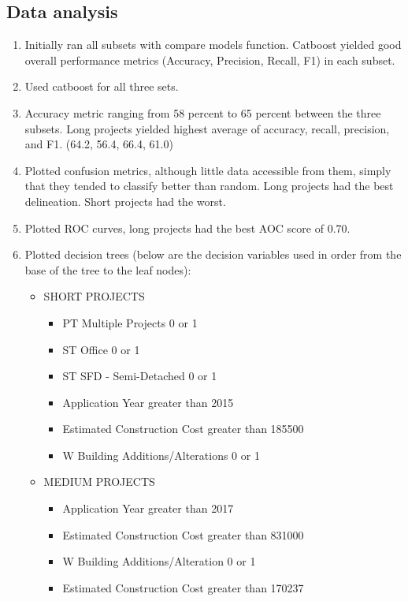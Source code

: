 \documentclass{article}
\begin{document}
\subsection{Data analysis}
\begin{enumerate}
    \item Initially ran all subsets with compare models function. Catboost yielded good overall performance metrics (Accuracy, Precision, Recall, F1) in each subset.
    \item Used catboost for all three sets.
    \item Accuracy metric ranging from 58 percent to 65 percent between the three subsets. Long projects yielded highest average of accuracy, recall, precision, and F1. (64.2, 56.4, 66.4, 61.0)
    \item Plotted confusion metrics, although little data accessible from them, simply that they tended to classify better than random. Long projects had the best delineation. Short projects had the worst.
    \item Plotted ROC curves, long projects had the best AOC score of 0.70. 
    \item Plotted decision trees (below are the decision variables used in order from the base of the tree to the leaf nodes): 
    \begin{itemize}
        \item SHORT PROJECTS
        \begin{itemize}
            \item PT Multiple Projects 0 or 1
            \item ST Office 0 or 1
            \item ST SFD - Semi-Detached 0 or 1
            \item Application Year greater than 2015
            \item Estimated Construction Cost greater than 185500
            \item W Building Additions/Alterations 0 or 1
        \end{itemize}
        \item MEDIUM PROJECTS
        \begin{itemize}
            \item Application Year greater than 2017
            \item Estimated Construction Cost greater than 831000
            \item W Building Additions/Alteration 0 or 1
            \item Estimated Construction Cost greater than 170237

\end{itemize}
\end{itemize}
\end{enumerate}
\end{document}
